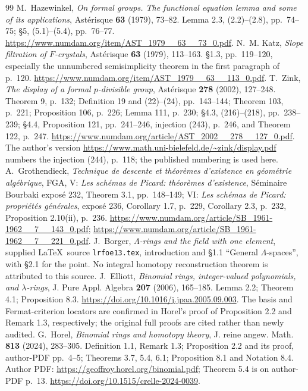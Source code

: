\documentclass[11pt,a4paper]{article}
\theoremstyle{definition}\newtheorem{remark}[theorem]{Remark}
\begin{document}
\begin{thebibliography}{99}
 M.~Hazewinkel, \emph{On formal groups. The functional equation lemma and some of its applications}, Ast\'erisque \textbf{63} (1979), 73--82. Lemma 2.3, (2.2)--(2.8), pp.~74--75; \S5, (5.1)--(5.4), pp.~76--77. \url{https://www.numdam.org/item/AST_1979__63__73_0.pdf}.
 N.~M. Katz, \emph{Slope filtration of $F$-crystals}, Ast\'erisque \textbf{63} (1979), 113--163. \S1.3, pp.~119--120, especially the unnumbered semisimplicity theorem in the first paragraph of p.~120. \url{https://www.numdam.org/item/AST_1979__63__113_0.pdf}.
 T.~Zink, \emph{The display of a formal $p$-divisible group}, Ast\'erisque \textbf{278} (2002), 127--248. Theorem 9, p.~132; Definition 19 and (22)--(24), pp.~143--144; Theorem 103, p.~221; Proposition 106, p.~226; Lemma 111, p.~230; \S4.3, (216)--(218), pp.~238--239; \S4.4, Proposition 121, pp.~241--246, injection (243), p.~246, and Theorem 122, p.~247. \url{https://www.numdam.org/article/AST_2002__278__127_0.pdf}. The author's version \url{https://www.math.uni-bielefeld.de/~zink/display.pdf} numbers the injection (244), p.~118; the published numbering is used here.
 A.~Grothendieck, \emph{Technique de descente et th\'eor\`emes d'existence en g\'eom\'etrie alg\'ebrique}, FGA, V: \emph{Les sch\'emas de Picard: th\'eor\`emes d'existence}, S\'eminaire Bourbaki expos\'e 232, Theorem 3.1, pp.~148--149; VI: \emph{Les sch\'emas de Picard: propri\'et\'es g\'en\'erales}, expos\'e 236, Corollary 1.7, p.~229, Corollary 2.3, p.~232, Proposition 2.10(ii), p.~236. \url{https://www.numdam.org/article/SB_1961-1962__7__143_0.pdf}; \url{https://www.numdam.org/article/SB_1961-1962__7__221_0.pdf}.
 J.~Borger, \emph{$\Lambda$-rings and the field with one element}, supplied \LaTeX\ source \texttt{lrfoe13.tex}, introduction and \S1.1 ``General $\Lambda$-spaces'', with \S2.1 for the point. No integral homotopy reconstruction theorem is attributed to this source.
 J.~Elliott, \emph{Binomial rings, integer-valued polynomials, and $\lambda$-rings}, J. Pure Appl. Algebra \textbf{207} (2006), 165--185. Lemma 2.2; Theorem 4.1; Proposition 8.3. \url{https://doi.org/10.1016/j.jpaa.2005.09.003}. The basis and Fermat-criterion locators are confirmed in Horel's proof of Proposition 2.2 and Remark 1.3, respectively; the original full proofs are cited rather than newly audited.
 G.~Horel, \emph{Binomial rings and homotopy theory}, J. reine angew. Math. \textbf{813} (2024), 283--305. Definition 1.1, Remark 1.3; Proposition 2.2 and its proof, author-PDF pp.~4--5; Theorems 3.7, 5.4, 6.1; Proposition 8.1 and Notation 8.4. Author PDF: \url{https://geoffroy.horel.org/binomial.pdf}; Theorem 5.4 is on author-PDF p.~13. \url{https://doi.org/10.1515/crelle-2024-0039}.
\end{thebibliography}
\end{document}
